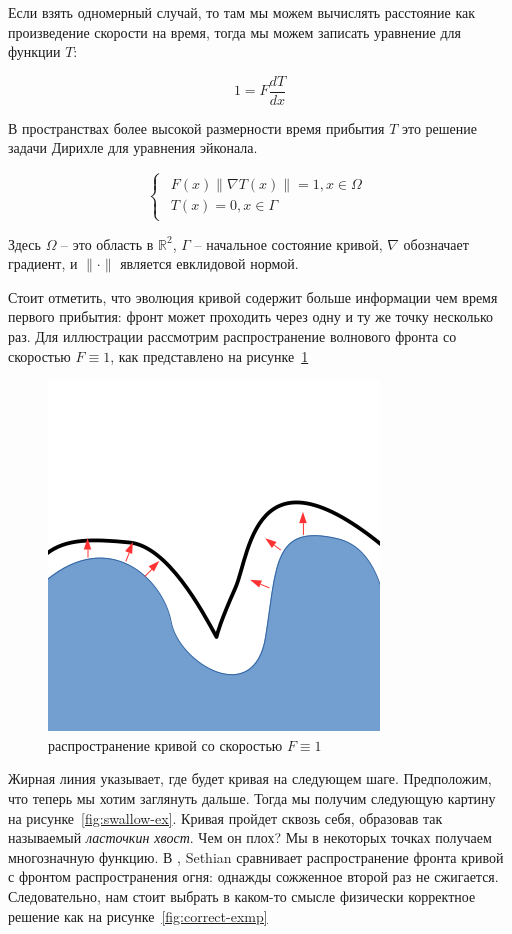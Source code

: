 \documentclass[a4paper,12pt]{article}
\begin{document}
Если взять одномерный случай, то там мы можем вычислять расстояние как
произведение скорости на время, тогда мы можем записать уравнение для
функции $T$:

\begin{equation*}
  1 = F \frac{dT}{dx}
\end{equation*}

В пространствах более высокой размерности время прибытия $T$ это решение
задачи Дирихле для уравнения эйконала.

\begin{equation}
  \label{eq:eikonal}
  \begin{cases}
    \begin{array}{ll}
      F(x) \| \nabla T(x) \| = 1, x \in \Omega \\
      T(x) = 0, x \in \Gamma
    \end{array}
  \end{cases}
\end{equation}

Здесь $\Omega$ -- это область в $\mathbb{R}^2$, $\Gamma$ -- начальное
состояние кривой, $\nabla$ обозначает градиент, и $\| \cdot \|$ является
евклидовой нормой.

Стоит отметить, что эволюция кривой содержит больше информации чем
время первого прибытия: фронт может проходить через одну и ту же точку
несколько раз. Для иллюстрации рассмотрим распространение
волнового фронта со скоростью $F \equiv 1$, как представлено на
рисунке~\ref{fig:prpgt-eik}

\begin{figure}[h]
  \centering
  \includegraphics[width=0.3\linewidth]{propagate_eikonal.png}
  \hfil \caption{распространение кривой со скоростью $F \equiv 1$}
  \label{fig:prpgt-eik}

\end{figure}

Жирная линия указывает, где будет кривая на следующем шаге.
Предположим, что теперь мы хотим заглянуть дальше. Тогда мы получим
следующую картину на рисунке~\ref{fig:swallow-ex}. Кривая пройдет
сквозь себя, образовав так называемый \textit{ласточкин хвост}. Чем он
плох? Мы в некоторых точках получаем многозначную функцию. В
\cite{S1999}, Sethian сравнивает распространение фронта кривой с
фронтом распространения огня: однажды сожженное второй раз не
сжигается. Следовательно, нам стоит выбрать в каком-то смысле
физически корректное решение как на рисунке~\ref{fig:correct-exmp}
\end{document}
